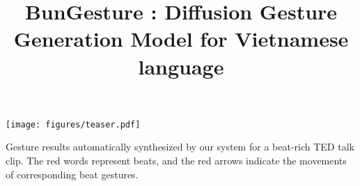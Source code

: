 \documentclass[sigconf]{acmart}
\begin{document}
\title{BunGesture : Diffusion Gesture Generation Model for Vietnamese language}










\begin{teaserfigure}
  \texttt{[image: figures/teaser.pdf]}
  \caption{Gesture results automatically synthesized by our system for a beat-rich TED talk clip. The red words represent beats, and the red arrows indicate the movements of corresponding beat gestures.}
  \label{fig:teaser}
\end{teaserfigure}

\maketitle












% 



\end{document}
